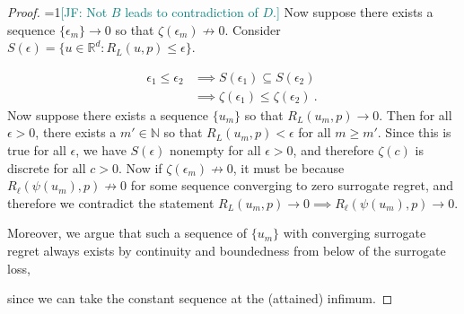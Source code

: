 \documentclass[11pt]{article} %
\newcommand{\Comments}{1}
\newcommand{\mynote}[2]{\ifnum\Comments=1\textcolor{#1}{#2}\fi}
\newcommand{\mytodo}[2]{\ifnum\Comments=1%
	\todo[linecolor=#1!80!black,backgroundcolor=#1,bordercolor=#1!80!black]{#2}\fi}
\newcommand{\jessie}[1]{\mynote{teal}{[JF: #1]}}
\newcommand{\jessiet}[1]{\mytodo{teal!20!white}{JF: #1}}
\newcommand{\btw}[1]{}%
\newcommand{\reals}{\mathbb{R}}
\newcommand{\simplex}{\Delta_\Y}
\newcommand{\Y}{\mathcal{Y}}
\begin{document}
\begin{proof}
\jessie{Not $B$ leads to contradiction of $D$.}
Now suppose there exists a sequence $\{\epsilon_m\} \to 0$ so that $\zeta(\epsilon_m) \not \to 0$.
Consider $S(\epsilon) = \{u \in \reals^d : R_L(u,p) \leq \epsilon\}$.

\begin{align*}
\epsilon_1 \leq \epsilon_2 &\implies S(\epsilon_1) \subseteq S(\epsilon_2)\\
&\implies \zeta(\epsilon_1) \leq \zeta(\epsilon_2)~.~
\end{align*}
Now suppose there exists a sequence $\{u_m\}$ so that $R_L(u_m, p) \to 0$.
Then for all $\epsilon > 0$, there exists a $m' \in \mathbb{N}$ so that $R_L(u_m, p) < \epsilon$ for all $m \geq m'$.
Since this is true for all $\epsilon$, we have $S(\epsilon)$ nonempty for all $\epsilon > 0$, and therefore $\zeta(c)$ is discrete for all $c > 0$.
Now if $\zeta(\epsilon_m) \not \to 0$, it must be because $R_\ell(\psi(u_m), p) \not \to 0$ for some sequence converging to zero surrogate regret, and therefore we contradict the statement $R_L(u_m, p) \to 0 \implies R_\ell(\psi(u_m), p) \to 0$.

Moreover, we argue that such a sequence of $\{u_m\}$ with converging surrogate regret always exists by continuity and boundedness from below of the surrogate loss,
\btw{really just need lower semi-continuity and boundedness from below}
since we can take the constant sequence at the (attained) infimum.
%
%	
\end{proof}
\end{document}
